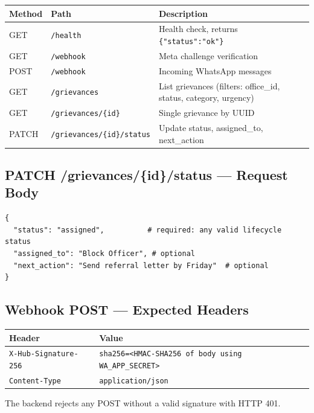 \documentclass[11pt, a4paper]{article}
\begin{document}
\renewcommand{\arraystretch}{1.4}
\begin{tabularx}{\linewidth}{llX}
\toprule
\textbf{Method} & \textbf{Path} & \textbf{Description} \\
\midrule
GET    & \texttt{/health}                    & Health check, returns \texttt{\{"status":"ok"\}} \\
GET    & \texttt{/webhook}                   & Meta challenge verification \\
POST   & \texttt{/webhook}                   & Incoming WhatsApp messages \\
GET    & \texttt{/grievances}                & List grievances (filters: office\_id, status, category, urgency) \\
GET    & \texttt{/grievances/\{id\}}         & Single grievance by UUID \\
PATCH  & \texttt{/grievances/\{id\}/status}  & Update status, assigned\_to, next\_action \\
\bottomrule
\end{tabularx}

\subsection{PATCH /grievances/\{id\}/status — Request Body}

\begin{lstlisting}[style=python, caption={StatusUpdate schema}]
{
  "status": "assigned",          # required: any valid lifecycle status
  "assigned_to": "Block Officer", # optional
  "next_action": "Send referral letter by Friday"  # optional
}
\end{lstlisting}

\subsection{Webhook POST — Expected Headers}

\begin{tabularx}{\linewidth}{lX}
\toprule
\textbf{Header} & \textbf{Value} \\
\midrule
\texttt{X-Hub-Signature-256} & \texttt{sha256=<HMAC-SHA256 of body using WA\_APP\_SECRET>} \\
\texttt{Content-Type}        & \texttt{application/json} \\
\bottomrule
\end{tabularx}

The backend rejects any POST without a valid signature with HTTP 401.
\end{document}
